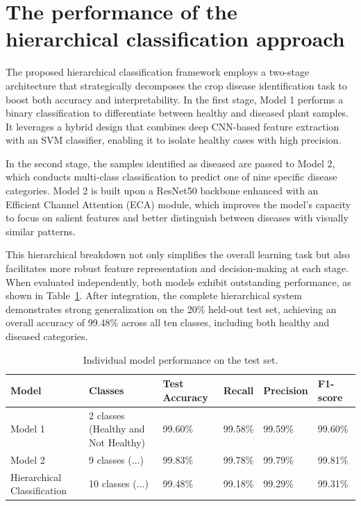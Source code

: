 \section{The performance of the hierarchical classification approach}
The proposed hierarchical classification framework employs a two-stage architecture that strategically decomposes the crop disease identification task to boost both accuracy and interpretability. In the first stage, Model 1 performs a binary classification to differentiate between healthy and diseased plant samples. It leverages a hybrid design that combines deep CNN-based feature extraction with an SVM classifier, enabling it to isolate healthy cases with high precision.

In the second stage, the samples identified as diseased are passed to Model 2, which conducts multi-class classification to predict one of nine specific disease categories. Model 2 is built upon a ResNet50 backbone enhanced with an Efficient Channel Attention (ECA) module, which improves the model’s capacity to focus on salient features and better distinguish between diseases with visually similar patterns.


This hierarchical breakdown not only simplifies the overall learning task but also facilitates more robust feature representation and decision-making at each stage. When evaluated independently, both models exhibit outstanding performance, as shown in Table~\ref{tab:hierarchical}. After integration, the complete hierarchical system demonstrates strong generalization on the 20\% held-out test set, achieving an overall accuracy of 99.48\% across all ten classes, including both healthy and diseased categories.

\begin{table}[H]
    \centering
    \renewcommand{\arraystretch}{1.5}
    \setlength{\tabcolsep}{10pt}
    \begin{tabular}{|p{2cm}|p{4cm}|p{2cm}|p{2cm}|p{2cm}|p{2cm}|}
        \hline
        \textbf{Model} & \textbf{Classes} & \textbf{Test Accuracy} & \textbf{Recall} & \textbf{Precision} & \textbf{F1-score} \\ \hline
        Model 1 & 2 classes (Healthy and Not Healthy) & 99.60\% & 99.58\% & 99.59\% & 99.60\% \\ \hline
        Model 2 & 9 classes (...) & 99.83\% & 99.78\% & 99.79\% & 99.81\% \\ \hline
        Hierarchical Classification & 10 classes (...) & 99.48\% & 99.18\% & 99.29\% & 99.31\% \\ \hline
    \end{tabular}
    \caption{Individual model performance on the test set.}
    \label{tab:hierarchical}
\end{table}


